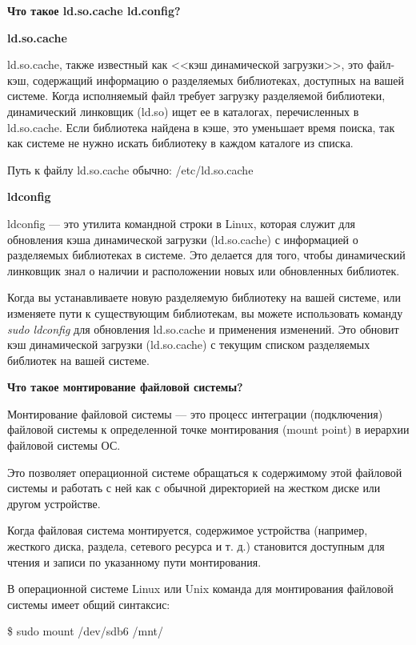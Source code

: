 \documentclass[oneside, final, 14pt]{extreport} %
\begin{document}
\vspace*{\baselineskip}

\textbf{Что такое ld.so.cache ld.config?}

\textbf{ld.so.cache}

ld.so.cache, также известный как <<кэш динамической загрузки>>, это файл-кэш, содержащий информацию о разделяемых библиотеках, доступных на вашей системе. Когда исполняемый файл требует загрузку разделяемой библиотеки, динамический линковщик (ld.so) ищет ее в каталогах, перечисленных в ld.so.cache. Если библиотека найдена в кэше, это уменьшает время поиска, так как системе не нужно искать библиотеку в каждом каталоге из списка.

Путь к файлу ld.so.cache обычно: /etc/ld.so.cache

\textbf{ldconfig}

ldconfig --- это утилита командной строки в Linux, которая служит для обновления кэша динамической загрузки (ld.so.cache) с информацией о разделяемых библиотеках в системе. Это делается для того, чтобы динамический линковщик знал о наличии и расположении новых или обновленных библиотек. 

Когда вы устанавливаете новую разделяемую библиотеку на вашей системе, или изменяете пути к существующим библиотекам, вы можете использовать команду \textit{ sudo ldconfig} для обновления ld.so.cache и применения изменений. Это обновит кэш динамической загрузки (ld.so.cache) с текущим списком разделяемых библиотек на вашей системе.

\vspace*{\baselineskip}

\textbf{Что такое монтирование файловой системы?}

Монтирование файловой системы --- это процесс интеграции (подключения) файловой системы к определенной точке монтирования (mount point) в иерархии файловой системы ОС.

Это позволяет операционной системе обращаться к содержимому этой файловой системы и работать с ней как с обычной директорией на жестком диске или другом устройстве.

Когда файловая система монтируется, содержимое устройства (например, жесткого диска, раздела, сетевого ресурса и т. д.) становится доступным для чтения и записи по указанному пути монтирования.

В операционной системе Linux или Unix команда для монтирования файловой системы имеет общий синтаксис:

\$ sudo mount /dev/sdb6 /mnt/
\end{document}
